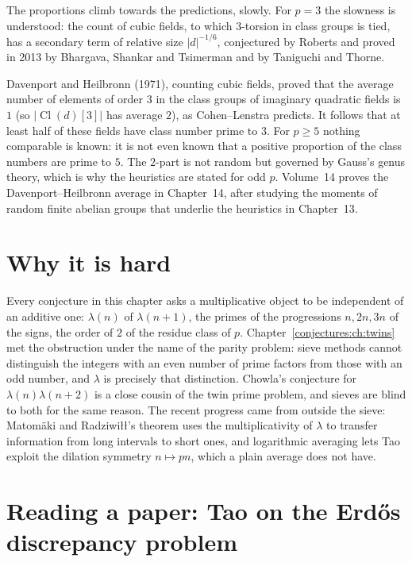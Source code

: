 The proportions climb towards the predictions, slowly. For $p=3$ the slowness is understood: the count of cubic fields, to which $3$-torsion in class
groups is tied, has a secondary term of relative size $|d|^{-1/6}$, conjectured by Roberts and proved in 2013 by Bhargava, Shankar and Tsimerman and by
Taniguchi and Thorne.

\begin{remark}\label{conjectures:rem:clknown}
Davenport and Heilbronn (1971), counting cubic fields, proved that the average number of elements of order $3$ in the class groups of imaginary quadratic
fields is $1$ (so $|\operatorname{Cl}(d)[3]|$ has average $2$), as Cohen--Lenstra predicts. It follows that at least half of these fields have class number prime to $3$. For
$p\ge5$ nothing comparable is known: it is not even known that a positive proportion of the class numbers are prime to $5$. The $2$-part is not random but governed by Gauss's genus
theory, which is why the heuristics are stated for odd $p$. Volume~14 proves the Davenport--Heilbronn average in Chapter~14, after studying the moments of
random finite abelian groups that underlie the heuristics in Chapter~13.
\end{remark}

\section{Why it is hard}

Every conjecture in this chapter asks a multiplicative object to be independent of an additive one: $\lambda(n)$ of $\lambda(n+1)$, the primes of the
progressions $n,2n,3n$ of the signs, the order of $2$ of the residue class of $p$. Chapter~\ref{conjectures:ch:twins} met the obstruction under the name of the parity
problem: sieve methods cannot distinguish the integers with an even number of prime factors from those with an odd number, and $\lambda$ is precisely that
distinction. Chowla's conjecture for $\lambda(n)\lambda(n+2)$ is a close cousin of the twin prime problem, and sieves are blind to both for the same reason. The recent progress came from
outside the sieve: Matom\"aki and Radziwi\l\l's theorem uses the multiplicativity of $\lambda$ to transfer information from long intervals to short ones, and
logarithmic averaging lets Tao exploit the dilation symmetry $n\mapsto pn$, which a plain average does not have.

\section{Reading a paper: Tao on the Erd\H os discrepancy problem}

